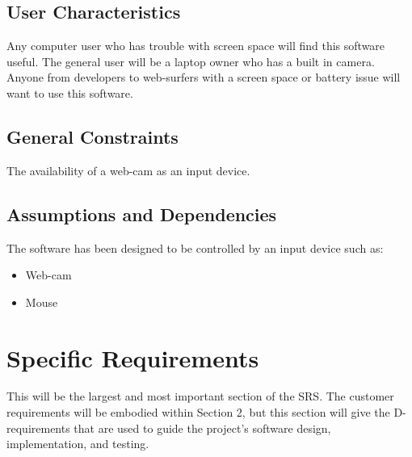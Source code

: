 \documentclass[titlepage]{article}
\begin{document}

\subsection{User Characteristics}
Any computer user who has trouble with screen space will find this software useful. The general user will be a laptop owner who has a built in camera. Anyone from developers to web-surfers with a screen space or battery issue will want to use this software.

\subsection{General Constraints}
The availability of a web-cam as an input device.  


\subsection{Assumptions and Dependencies}
The software has been designed to be controlled by an input device such as: 
\begin{itemize}
	\item Web-cam
	\item Mouse
\end{itemize}


\section{Specific Requirements}
\label{Specific Requirements}
This will be the largest and most important section of the SRS.  The customer requirements will be embodied within Section 2, but this section will give the D-requirements that are used to guide the project’s software design, implementation, and testing.
\end{document}
